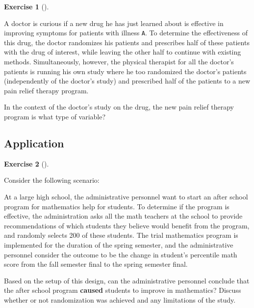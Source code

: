 \documentclass[
  letterpaper,
  DIV=11,
  numbers=noendperiod]{scrreprt}
\theoremstyle{definition}
\newtheorem{exercise}{Exercise}[chapter]
\theoremstyle{remark}
\begin{document}
\begin{exercise}[]\protect\hypertarget{exr-ch07-c10}{}\label{exr-ch07-c10}

A doctor is curious if a new drug he has just learned about is effective
in improving symptoms for patients with illness \texttt{A}. To determine
the effectiveness of this drug, the doctor randomizes his patients and
prescribes half of these patients with the drug of interest, while
leaving the other half to continue with existing methods.
Simultaneously, however, the physical therapist for all the doctor's
patients is running his own study where he too randomized the doctor's
patients (independently of the doctor's study) and prescribed half of
the patients to a new pain relief therapy program.

In the context of the doctor's study on the drug, the new pain relief
therapy program is what type of variable?

\end{exercise}

\hypertarget{sec-ex07-application}{%
\subsection{Application}\label{sec-ex07-application}}

\begin{exercise}[]\protect\hypertarget{exr-ch07-app1}{}\label{exr-ch07-app1}

Consider the following scenario:

At a large high school, the administrative personnel want to start an
after school program for mathematics help for students. To determine if
the program is effective, the administration asks all the math teachers
at the school to provide recommendations of which students they believe
would benefit from the program, and randomly selects 200 of these
students. The trial mathematics program is implemented for the duration
of the spring semester, and the administrative personnel consider the
outcome to be the change in student's percentile math score from the
fall semester final to the spring semester final.

Based on the setup of this design, can the administrative personnel
conclude that the after school program \textbf{caused} students to
improve in mathematics? Discuss whether or not randomization was
achieved and any limitations of the study.

\end{exercise}
\end{document}
